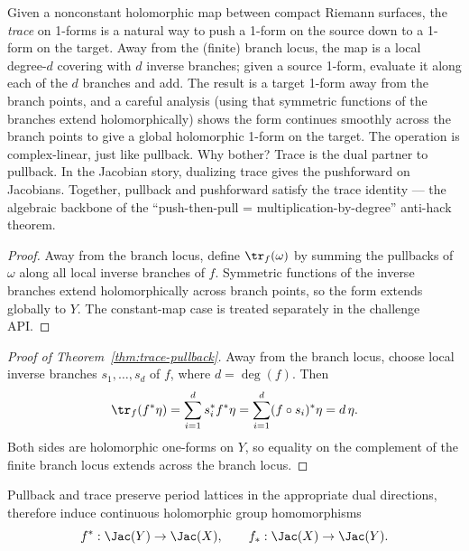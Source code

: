 \begin{layman}
Given a nonconstant holomorphic map between compact Riemann surfaces,
the \emph{trace} on 1-forms is a natural way to push a 1-form on the
source down to a 1-form on the target. Away from the (finite) branch
locus, the map is a local degree-\(d\) covering with \(d\) inverse
branches; given a source 1-form, evaluate it along each of the \(d\)
branches and add. The result is a target 1-form away from the branch
points, and a careful analysis (using that symmetric functions of the
branches extend holomorphically) shows the form continues smoothly
across the branch points to give a global holomorphic 1-form on the
target. The operation is complex-linear, just like pullback. Why
bother? Trace is the dual partner to pullback. In the Jacobian story,
dualizing trace gives the pushforward on Jacobians. Together,
pullback and pushforward satisfy the trace identity — the algebraic
backbone of the ``push-then-pull = multiplication-by-degree''
anti-hack theorem.
\end{layman}

\begin{proof}
Away from the branch locus, define \(\tr_f(\omega)\) by summing the pullbacks
of \(\omega\) along all local inverse branches of \(f\). Symmetric functions
of the inverse branches extend holomorphically across branch points, so the
form extends globally to \(Y\). The constant-map case is treated separately in
the challenge API.
\end{proof}

\begin{proof}[Proof of Theorem~\ref{thm:trace-pullback}]
Away from the branch locus, choose local inverse branches
\(s_1,\dots,s_d\) of \(f\), where \(d=\deg(f)\). Then
\[
  \tr_f(f^{*}\eta)
  =
  \sum_{i=1}^{d}s_i^{*}f^{*}\eta
  =
  \sum_{i=1}^{d}(f\circ s_i)^{*}\eta
  =
  d\,\eta.
\]
Both sides are holomorphic one-forms on \(Y\), so equality on the complement
of the finite branch locus extends across the branch locus.
\end{proof}

\begin{lemma}
\label{lem:push-pull-descend}
Pullback and trace preserve period lattices in the appropriate dual directions,
therefore induce continuous holomorphic group homomorphisms
\[
  f^{*}:\Jac(Y)\to\Jac(X), \qquad f_*:\Jac(X)\to\Jac(Y).
\]
\leanok
\end{lemma}

